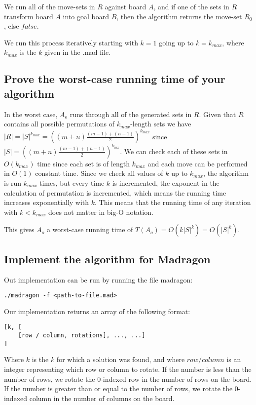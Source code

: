 \documentclass[12pt]{article}
\begin{document}
We run all of the move-sets in $R$ against board $A$, and if one of the sets in $R$ transform board $A$ into goal board $B$, then the algorithm returns the move-set $R_0$, else $false$.

We run this process iteratively starting with $k = 1$ going up to $k = k_{max}$, where $k_{max}$ is the $k$ given in the .mad file.

\subsection{Prove the worst-case running time of your algorithm}
\label{sub:Prove the worst-case running time of your algorithm}

In the worst case, $A_o$ runs through all of the generated sets in $R$. Given that $R$ contains all possible permutations of $k_{max}$-length sets we have $|R| = |S|^{k_{max}} = ((m+n)\frac{(m-1)+(n-1)}{2})^{k_{max}}$ since $|S| = ((m+n)\frac{(m-1)+(n-1)}{2})^{k_{mx}}$. We can check each of these sets in $O(k_{max})$ time since each set is of length $k_{max}$ and each move can be performed in $O(1)$ constant time. Since we check all values of $k$ up to $k_{max}$, the algorithm is run $k_{max}$ times, but every time $k$ is incremented, the exponent in the calculation of permutation is incremented, which means the running time increases exponentially with $k$. This means that the running time of any iteration with $k < k_{max}$ does not matter in big-O notation.

This gives $A_o$ a worst-case running time of $T(A_o) = O(k|S|^k) = O(|S|^k)$.

\subsection{Implement the algorithm for Madragon}
\label{sub:Implement the algorithm for Madragon}

Out implementation can be run by running the file madragon:

\begin{lstlisting}
./madragon -f <path-to-file.mad>
\end{lstlisting}

Our implementation returns an array of the following format:

\begin{lstlisting}
[k, [
    [row / column, rotations], ..., ...]
]
\end{lstlisting}

Where $k$ is the $k$ for which a solution was found, and where $row / column$ is an integer representing which row or column to rotate.
If the number is less than the number of rows, we rotate the 0-indexed row in the number of rows on the board.
If the number is greater than or equal to the number of rows, we rotate the 0-indexed column in the number of columns on the board.
\end{document}
